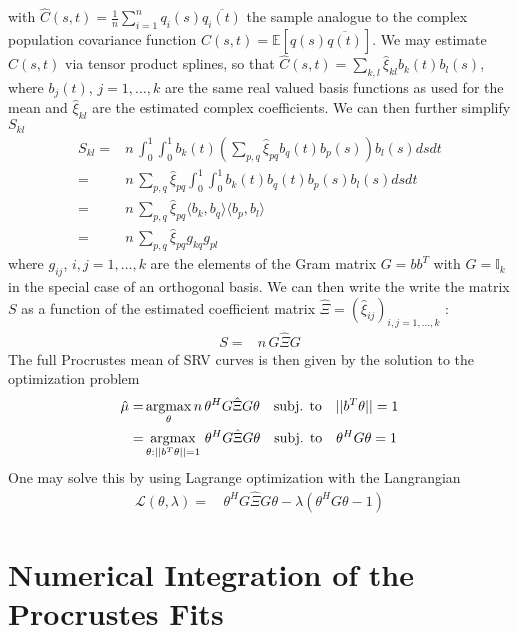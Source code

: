 with $\hat{C}(s,t) = \frac{1}{n} \sum_{i=1}^n q_i(s) \overline{q_i(t)}$ the sample analogue to the complex population covariance function $C(s,t) = \mathbb{E}[q(s)\overline{q(t)}]$.
We may estimate $C(s,t)$ via tensor product splines, so that $\hat{C}(s,t) = \sum_{k,l} \hat{\xi}_{kl} b_k(t) b_l(s)$, where $b_j(t)$, $j=1,\dots,k$ are the same real valued basis functions as used for the mean and $\hat{\xi}_{kl}$ are the estimated complex coefficients.
We can then further simplify $S_{kl}$
\begin{align*}
    S_{kl} =& n \, \int_0^1 \int_0^1 b_k(t) \left( \sum_{p,q} \hat{\xi}_{pq} b_q(t) b_p(s) \right) b_l(s) ds dt\\
    =& n \, \sum_{p,q} \hat{\xi}_{pq} \int_0^1 \int_0^1 b_k(t) b_q(t) b_p(s) b_l(s) ds dt\\
    =& n \, \sum_{p,q} \hat{\xi}_{pq} \langle b_k, b_q \rangle \langle b_p, b_l \rangle\\
    =& n \, \sum_{p,q} \hat{\xi}_{pq} g_{kq} g_{pl}
\end{align*}
where $g_{ij}$, $i,j = 1, \dots, k$ are the elements of the Gram matrix $G = bb^T$ with $G = \mathbb{I}_k$ in the special case of an orthogonal basis.
We can then write the write the matrix $S$ as a function of the estimated coefficient matrix $\hat{\Xi} = (\hat{\xi}_{ij})_{i,j = 1, \dots, k}$ :
\begin{align*}
    S =& n \, G \hat{\Xi} G
\end{align*}
The full Procrustes mean of SRV curves is then given by the solution to the optimization problem
\begin{align*}
    \hat{\mu} =& \operatorname*{argmax}_{\theta} n \, \theta^H G \hat{\Xi} G \theta \quad \text{subj. to} \quad ||b^T \theta|| = 1 \\
    =& \operatorname*{argmax}_{\theta : ||b^T\theta||=1} \, \theta^H G \hat{\Xi} G \theta \quad \text{subj. to} \quad \theta^H G \theta = 1
\end{align*}
One may solve this by using Lagrange optimization with the Langrangian
\begin{align*}
  \mathcal{L}(\theta,\lambda) =& \, \theta^H G \hat{\Xi} G \theta - \lambda ( \theta^H G \theta - 1)
\end{align*}



\section{Numerical Integration of the Procrustes Fits}


